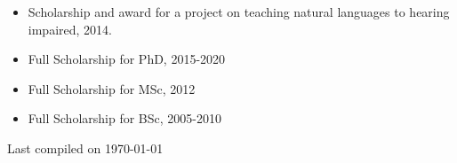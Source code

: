 \spacedhrule{0.5em}{-0.4em} %


\begin{itemize}
    \item Scholarship and award for a project on teaching natural languages to hearing impaired, 2014.
    \item Full Scholarship for PhD, 2015-2020
    \item Full Scholarship for MSc, 2012 
    \item Full Scholarship for BSc, 2005-2010
\end{itemize}

\spacedhrule{0.5em}{-0.4em} %

\vfill \hfill \small Last compiled on \today

